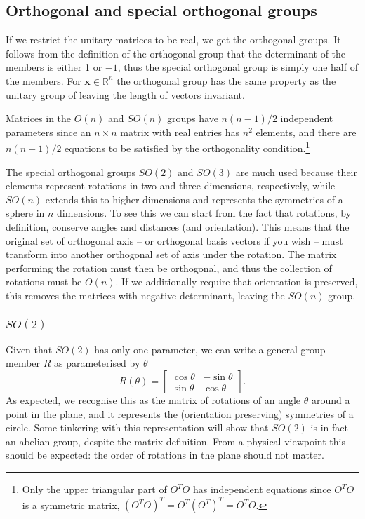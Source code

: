 \documentclass[notes.tex]{subfiles}
\begin{document}
\subsection{Orthogonal and special orthogonal groups}
If we restrict the unitary matrices to be real, we get the orthogonal groups.
It follows from the definition of the orthogonal group that the determinant of the members is either 1 or $-1$, thus the special orthogonal group is simply one half of the members. For $\mathbf{x} \in \mathbb{R}^n$ the orthogonal group has the same property as the unitary group of leaving the length of vectors invariant. 

Matrices in the $O(n)$ and $SO(n)$ groups have $n(n-1)/2$ independent parameters since an $n\times n$ matrix with real entries has $n^2$ elements, and there are $n(n+1)/2$ equations to be satisfied by the orthogonality condition.\footnote{Only the upper triangular part of $O^TO$ has independent equations since $O^TO$ is a symmetric matrix, $(O^TO)^T=O^T(O^T)^T=O^TO$. } 

The special orthogonal groups $SO(2)$ and $SO(3)$ are much used because their elements represent rotations in two and three dimensions, respectively, while $SO(n)$ extends this to higher dimensions and represents the symmetries of a sphere in $n$ dimensions. To see this we can start from the fact that rotations, by definition, conserve angles and distances (and orientation). This means that the original set of orthogonal axis -- or orthogonal basis vectors if you wish -- must transform into another orthogonal set of axis under the rotation. The matrix performing the rotation must then be orthogonal, and thus  the collection of rotations must be $O(n)$. If we additionally require that orientation is preserved, this removes the matrices with negative determinant, leaving the $SO(n)$ group.


\subsubsection{$SO(2)$}
Given that $SO(2)$ has only one parameter, we can write a general group member $R$ as parameterised by $\theta$
\[
R(\theta)=\left[\begin{matrix} \cos\theta &  -\sin\theta \\ \sin\theta&  \cos\theta \end{matrix}\right].
\]
As expected, we recognise this as the matrix of rotations of an angle $\theta$ around a point in the plane, and it represents the (orientation preserving) symmetries of a circle. Some tinkering with this representation will show that $SO(2)$ is in fact an abelian group, despite the matrix definition. From a physical viewpoint this should be expected: the order of rotations in the plane should not matter.
\end{document}
